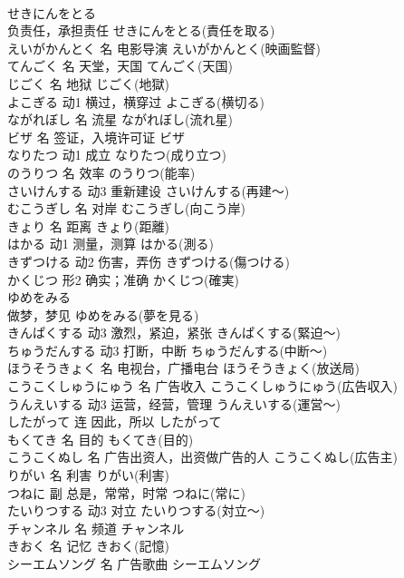 \documentclass[8pt]{extreport}
\begin{document}
\begin{CJK}{UTF8}{min}
\\	せきにんをとる	
\\	负责任，承担责任	せきにんをとる(責任を取る)	
\\	えいがかんとく	名	电影导演	えいがかんとく(映画監督)	
\\	てんごく	名	天堂，天国	てんごく(天国)	
\\	じごく	名	地狱	じごく(地獄)	
\\	よこぎる	动1	横过，横穿过	よこぎる(横切る)	
\\	ながれぼし	名	流星	ながれぼし(流れ星)	
\\	ビザ	名	签证，入境许可证	ビザ	
\\	なりたつ	动1	成立	なりたつ(成り立つ)	
\\	のうりつ	名	效率	のうりつ(能率)	
\\	さいけんする	动3	重新建设	さいけんする(再建～)	
\\	むこうぎし	名	对岸	むこうぎし(向こう岸)	
\\	きょり	名	距离	きょり(距離)	
\\	はかる	动1	测量，测算	はかる(測る)	
\\	きずつける	动2	伤害，弄伤	きずつける(傷つける)	
\\	かくじつ	形2	确实；准确	かくじつ(確実)	
\\	ゆめをみる	
\\	做梦，梦见	ゆめをみる(夢を見る)	
\\	きんぱくする	动3	激烈，紧迫，紧张	きんぱくする(緊迫～)	
\\	ちゅうだんする	动3	打断，中断	ちゅうだんする(中断～)	
\\	ほうそうきょく	名	电视台，广播电台	ほうそうきょく(放送局)	
\\	こうこくしゅうにゅう	名	广告收入	こうこくしゅうにゅう(広告収入)	
\\	うんえいする	动3	运营，经营，管理	うんえいする(運営～)	
\\	したがって	连	因此，所以	したがって	
\\	もくてき	名	目的	もくてき(目的)	
\\	こうこくぬし	名	广告出资人，出资做广告的人	こうこくぬし(広告主)	
\\	りがい	名	利害	りがい(利害)	
\\	つねに	副	总是，常常，时常	つねに(常に)	
\\	たいりつする	动3	对立	たいりつする(対立～)	
\\	チャンネル	名	频道	チャンネル	
\\	きおく	名	记忆	きおく(記憶)	
\\	シーエムソング	名	广告歌曲	シーエムソング

\end{CJK}
\end{document}
